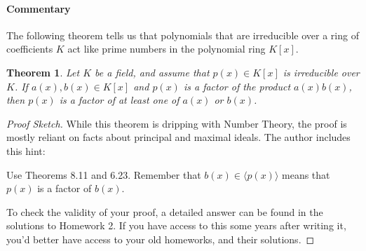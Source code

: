 \documentclass[letterpaper, 12pt]{article}
\newcommand{\pid}[1]{\langle #1 \rangle}
\newtheorem{thm}{Theorem}
\begin{document}
			\paragraph{\color{blue}Commentary}
			\color{blue}
			The following theorem tells us that polynomials that are irreducible over a ring of coefficients $K$ act like prime numbers in the polynomial ring $K[x]$.
			\color{black}
			\begin{thm}
			Let $K$ be a field, and assume that $p(x) \in K[x]$ is irreducible over $K$. 
			If $a(x), b(x) \in K[x]$ and $p(x)$ is a factor of the product $a(x)b(x)$, then $p(x)$ is a factor of at least one of $a(x)$ or $b(x)$.
			\end{thm}
			\color{blue}
			\begin{proof}[Proof Sketch]
			While this theorem is dripping with Number Theory, the proof is mostly reliant on facts about principal and maximal ideals.
			The author includes this hint:

			Use Theorems 8.11 and 6.23.
			Remember that $b(x) \in \pid{p(x)}$ means that $p(x)$ is a factor of $b(x)$.

			To check the validity of your proof, a detailed answer can be found in the solutions to Homework 2.
			If you have access to this some years after writing it, you'd better have access to your old homeworks, and their solutions.
			\end{proof}
			\color{black}
\end{document}

